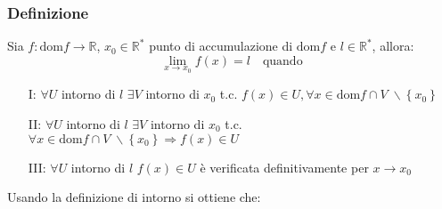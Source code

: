 \documentclass[a4paper]{article}
\newcommand\dom{\text{dom}}
\begin{document}
\subsubsection*{Definizione}
Sia \(f: \dom f \to \mathbb{R}\), \(x_0 \in \mathbb{R}^*\) punto di accumulazione di \(\dom f\) e \(l \in \mathbb{R}^*\), allora:
\[\lim_{x \to x_0} f(x) = l \quad \text{quando}\]
\begin{itemize}
	\item[I:] \(\forall U\) intorno di \(l\) \(\exists V\) intorno di \(x_0\) t.c. \(f(x) \in U, \forall x \in \dom f \cap V \; \backslash \left\{ x_0 \right\}\)
	\item[II:] \(\forall U\) intorno di \(l\) \(\exists V\) intorno di \(x_0\) t.c. \(\forall x \in \dom f \cap V \; \backslash \left\{ x_0 \right\} \Rightarrow f(x) \in U\)
	\item[III:] \(\forall U\) intorno di \(l\) \(f(x) \in U\) è verificata definitivamente per \(x \to x_0\)
\end{itemize}
Usando la definizione di intorno si ottiene che:
\end{document}
